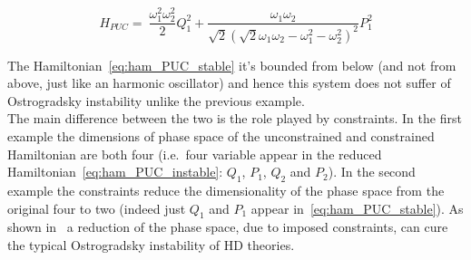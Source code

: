 \begin{equation} \label{eq:ham_PUC_stable}
  H_{PUC} =\ \frac{\omega_1^2\omega_2^2}{2} Q_1^2 +
  \frac{\omega_1\omega_2}{\sqrt{2} {\left(\sqrt{2} \omega_1\omega_2 -
  \omega_1^2 - \omega_2^2 \right)}^2} P_1^2
\end{equation}

The Hamiltonian~\eqref{eq:ham_PUC_stable} it's bounded from below (and not from
above, just like an harmonic oscillator) and hence this system does not suffer
of Ostrogradsky instability unlike the previous example. \\

The main difference between the two is the role played by constraints. In the
first example the dimensions of phase space of the unconstrained and constrained
Hamiltonian are both four (i.e.\ four variable appear in the reduced
Hamiltonian~\eqref{eq:ham_PUC_instable}: $Q_1$, $P_1$, $Q_2$ and $P_2$). In the
second example the constraints reduce the dimensionality of the phase space from
the original four to two (indeed just $Q_1$ and $P_1$ appear
in~\eqref{eq:ham_PUC_stable}). As shown in~\cite{Chen13} a reduction of the
phase space, due to imposed constraints, can cure the typical Ostrogradsky
instability of HD theories.
